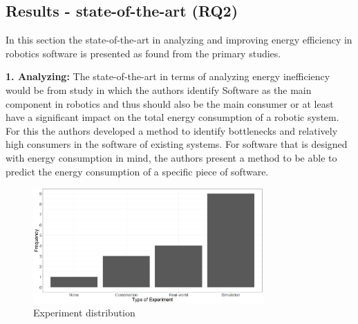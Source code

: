 \subsection{Results - state-of-the-art (RQ2)}
\label{sec:results:rq2_state_of_the_art}

In this section the state-of-the-art in analyzing and improving energy efficiency in robotics software is presented as found from the primary studies.

\noindent\textbf{1. Analyzing:}
The state-of-the-art in terms of analyzing energy inefficiency would be from study \cite{hou2017novel_cloud_evaluation_model} in which the authors
identify Software as the main component in robotics and thus should also be the main consumer or at least have a significant impact on the
total energy consumption of a robotic system.
For this the authors developed a method to identify bottlenecks and relatively high consumers in the software of existing systems.
For software that is designed with energy consumption in mind, the authors present a method to be able to predict the energy consumption
of a specific piece of software.

\begin{figure}
    \includegraphics[width=250pt]{figures/experiment_distr.png}
    \caption{Experiment distribution}
    \label{fig:experiment_distr}
\end{figure}

